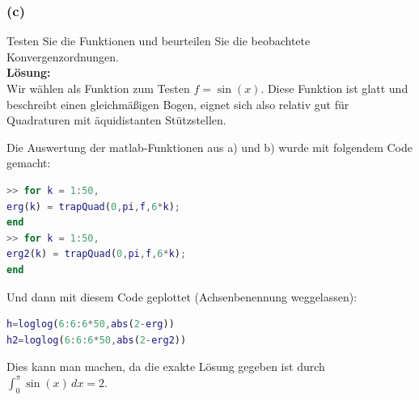 \documentclass[11pt,a4paper,ngerman]{article}
\begin{document}
\subsubsection*{(c)}
Testen Sie die Funktionen und beurteilen Sie die beobachtete Konvergenzordnungen.\\

\textbf{Lösung:}\\
Wir wählen als Funktion zum Testen $f = \sin(x)$. Diese Funktion ist glatt und beschreibt einen
gleichmäßigen Bogen, eignet sich also relativ gut für Quadraturen mit äquidistanten Stützstellen.


Die Auswertung der matlab-Funktionen aus a) und b) wurde mit folgendem Code gemacht:
\begin{lstlisting}[language=matlab]
>> for k = 1:50,                         
erg(k) = trapQuad(0,pi,f,6*k);
end
>> for k = 1:50,              
erg2(k) = trapQuad(0,pi,f,6*k);
end
\end{lstlisting}

Und dann mit diesem Code geplottet (Achsenbenennung weggelassen):
\begin{lstlisting}[language=matlab]
h=loglog(6:6:6*50,abs(2-erg)) 
h2=loglog(6:6:6*50,abs(2-erg2)) 
\end{lstlisting}
Dies kann man machen, da die exakte Lösung gegeben ist durch $\int_0^{\pi} \sin(x) \, dx = 2$.
\end{document}
